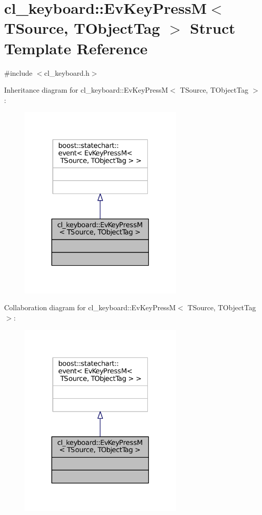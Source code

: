 \hypertarget{structcl__keyboard_1_1EvKeyPressM}{}\section{cl\+\_\+keyboard\+:\+:Ev\+Key\+PressM$<$ T\+Source, T\+Object\+Tag $>$ Struct Template Reference}
\label{structcl__keyboard_1_1EvKeyPressM}


{\ttfamily \#include $<$cl\+\_\+keyboard.\+h$>$}



Inheritance diagram for cl\+\_\+keyboard\+:\+:Ev\+Key\+PressM$<$ T\+Source, T\+Object\+Tag $>$\+:
\nopagebreak
\begin{figure}[H]
\begin{center}
\leavevmode
\includegraphics[width=222pt]{structcl__keyboard_1_1EvKeyPressM__inherit__graph}
\end{center}
\end{figure}


Collaboration diagram for cl\+\_\+keyboard\+:\+:Ev\+Key\+PressM$<$ T\+Source, T\+Object\+Tag $>$\+:
\nopagebreak
\begin{figure}[H]
\begin{center}
\leavevmode
\includegraphics[width=222pt]{structcl__keyboard_1_1EvKeyPressM__coll__graph}
\end{center}
\end{figure}



